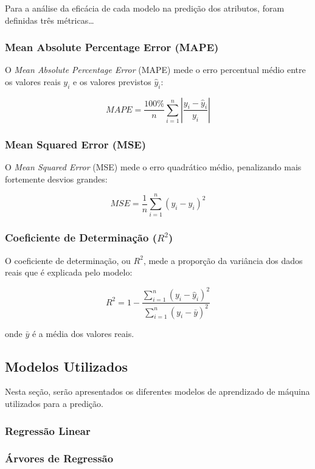 \documentclass{article}
\begin{document}
Para a análise da eficácia de cada modelo na predição dos atributos, foram definidas três métricas\dots

\subsubsection{Mean Absolute Percentage Error (MAPE)}

O \textit{Mean Absolute Percentage Error} (MAPE) mede o erro percentual médio entre
os valores reais $y_i$ e os valores previstos $\hat{y}_i$:

\[
MAPE = \frac{100\%}{n} \sum_{i=1}^{n} \left| \frac{y_i - \hat{y}_i}{y_i} \right|
\]



\subsubsection{Mean Squared Error (MSE)}

O \textit{Mean Squared Error} (MSE) mede o erro quadrático médio, penalizando mais
fortemente desvios grandes:

\[
MSE = \frac{1}{n} \sum_{i=1}^{n} (y_i - \hat{y}_i)^2
\]



\subsubsection{Coeficiente de Determinação ($R^2$)}

O coeficiente de determinação, ou $R^2$, mede a proporção da variância dos dados
reais que é explicada pelo modelo:

\[
R^2 = 1 - \frac{\sum_{i=1}^{n} (y_i - \hat{y}_i)^2}{\sum_{i=1}^{n} (y_i - \bar{y})^2}
\]

onde $\bar{y}$ é a média dos valores reais.

\subsection{Modelos Utilizados}

Nesta seção, serão apresentados os diferentes modelos de aprendizado de máquina utilizados para a predição. 

\subsubsection{Regressão Linear}
\subsubsection{Árvores de Regressão}
\end{document}

